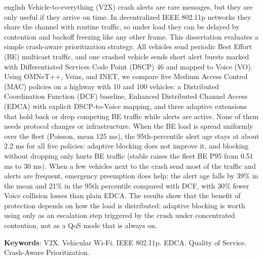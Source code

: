 \begin{resumo}[Abstract]
	\SingleSpacing
	\begin{otherlanguage*}{english}
	Vehicle-to-everything (V2X) crash alerts are rare messages, but they are only useful if they arrive on time. In decentralized IEEE 802.11p networks they share the channel with routine traffic, so under load they can be delayed by contention and backoff freezing like any other frame. This dissertation evaluates a simple crash-aware prioritization strategy. All vehicles send periodic Best Effort (BE) multicast traffic, and one crashed vehicle sends short alert bursts marked with Differentiated Services Code Point (DSCP) 46 and mapped to Voice (VO). Using OMNeT++, Veins, and INET, we compare five Medium Access Control (MAC) policies on a highway with 10 and 100 vehicles: a Distributed Coordination Function (DCF) baseline, Enhanced Distributed Channel Access (EDCA) with explicit DSCP-to-Voice mapping, and three adaptive extensions that hold back or drop competing BE traffic while alerts are active. None of them needs protocol changes or infrastructure. When the BE load is spread uniformly over the fleet (Poisson, mean 125 ms), the 95th-percentile alert age stays at about 2.2 ms for all five policies: adaptive blocking does not improve it, and blocking without dropping only hurts BE traffic (stable raises the fleet BE P95 from 0.51 ms to 30 ms). When a few vehicles next to the crash send most of the traffic and alerts are frequent, emergency preemption does help: the alert age falls by 39\% in the mean and 21\% in the 95th percentile compared with DCF, with 30\% fewer Voice collision losses than plain EDCA. The results show that the benefit of protection depends on how the load is distributed: adaptive blocking is worth using only as an escalation step triggered by the crash under concentrated contention, not as a QoS mode that is always on.

		\textbf{Keywords}: V2X. Vehicular Wi-Fi. IEEE 802.11p. EDCA. Quality of Service. Crash-Aware Prioritization.
	\end{otherlanguage*}
\end{resumo}

% 
%
%  

